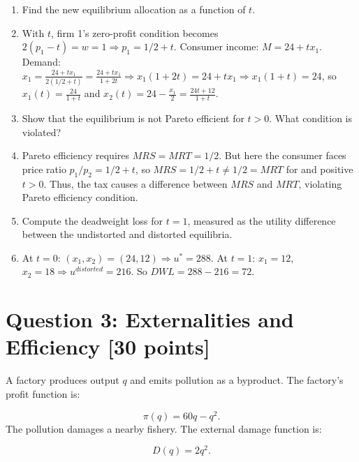 \documentclass[11pt]{article}
\begin{document}
\begin{enumerate}[label=(\alph*)]
\begin{enumerate}[label=(\roman*)]
\item Find the new equilibrium allocation as a function of $t$.
\item[] With $t$, firm 1's zero-profit condition becomes $2(p_1-t)=w=1\Rightarrow p_1=1/2+t$. Consumer income: $M=24+tx_1$. Demand: $x_1=\frac{24+tx_1}{2(1/2+t)}=\frac{24+tx_1}{1+2t}\Rightarrow x_1(1+2t)=24+tx_1\Rightarrow x_1(1+t)=24$, so $x_1(t)=\frac{24}{1+t}$ and $x_2(t)=24-\frac{x_1}{2}=\frac{24t+12}{1+t}$.
\item Show that the equilibrium is not Pareto efficient for $t > 0$. What condition is violated?
\item[] Pareto efficiency requires $MRS=MRT=1/2$. But here the consumer faces price ratio $p_1/p_2=1/2+t$, so $MRS=1/2+t\neq1/2=MRT$ for and positive $t>0$. Thus, the tax causes a difference between $MRS$ and $MRT$, violating Pareto efficiency condition.
\item Compute the deadweight loss for $t = 1$, measured as the utility difference between the undistorted and distorted equilibria.
\item[] At $t=0$: $(x_1,x_2)=(24,12)\Rightarrow u^*=288$. At $t=1$: $x_1=12$, $x_2=18\Rightarrow u^{distorted}=216$. So $DWL=288-216=72$.
\end{enumerate}

\end{enumerate}

\bigskip

\section*{Question 3: Externalities and Efficiency [30 points]}

A factory produces output $q$ and emits pollution as a byproduct. The factory's profit function is:

\[
\pi(q) = 60q - q^2.
\]
The pollution damages a nearby fishery. The external damage function is:

\[
D(q) = 2q^2.
\]
\end{document}
